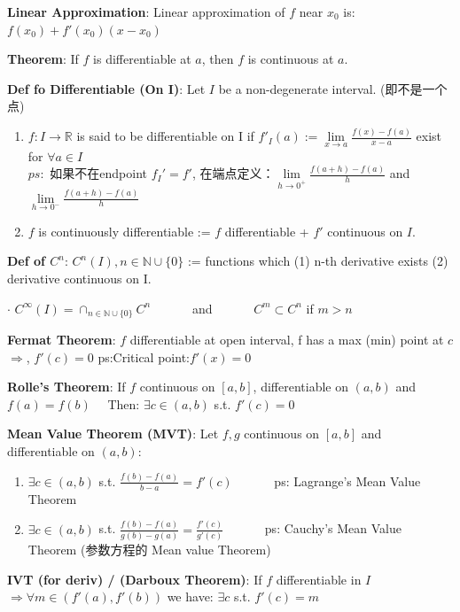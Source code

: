 \documentclass[11pt]{article}
\begin{document}
\textbf{Linear Approximation}: Linear approximation of $f$ near $x_0$ is: $f(x_0)+f'(x_0)(x-x_0)$

\textbf{Theorem}: If $f$ is differentiable at $a$, then $f$ is continuous at $a$.

\textbf{Def fo Differentiable (On I)}: Let $I$ be a non-degenerate interval. (即不是一个点)
\begin{enumerate}[itemsep=-2pt, topsep=-2pt]
    \item $f:I\to\mathbb{R}$ is said to be differentiable on I if $f'_I(a):=\lim\limits_{x\to a}\frac{f(x)-f(a)}{x-a}$ exist for $\forall a\in I$
    \\ $ps:$ 如果不在endpoint $f_I'=f'$, 在端点定义：$\lim\limits_{h\to 0^+}\frac{f(a+h)-f(a)}{h}$ and $\lim\limits_{h\to 0^-}\frac{f(a+h)-f(a)}{h}$
    \item $f$ is continuously differentiable := $f$ differentiable + $f'$ continuous on $I$.
\end{enumerate}

\textbf{Def of $C^n$}: $C^n(I),n\in \mathbb{N}\cup\{0\}$ := functions which (1) n-th derivative exists (2) derivative continuous on I.

$\cdot$ $C^\infty(I)=\cap_{n\in\mathbb{N}\cup\{0\}}C^n$ \ \ \ \ \ \ and \ \ \ \ \ \ $C^m\subset C^n$ if $m>n$

\textbf{Fermat Theorem}: $f$ differentiable at open interval, f has a max (min) point at $c$ $\Rightarrow$, $f'(c)=0$ {\footnotesize ps:Critical point:$f'(x)=0$}

\textbf{Rolle's Theorem}: If $f$ continuous on $[a,b]$, differentiable on $(a,b)$ and $f(a)=f(b)$ \ \ Then: $\exists c\in(a,b)$ s.t. $f'(c)=0$

\textbf{Mean Value Theorem (MVT)}: Let $f,g$ continuous on $[a,b]$ and differentiable on $(a,b)$: \ \ \ 
\begin{enumerate}[itemsep=-2pt, topsep=-2pt]
    \item $\exists c\in(a,b)$ s.t. $\frac{f(b)-f(a)}{b-a}=f'(c)$ \ \ \ \ \ \ ps: Lagrange's Mean Value Theorem
    \item $\exists c\in(a,b)$ s.t. $\frac{f(b)-f(a)}{g(b)-g(a)}=\frac{f'(c)}{g'(c)}$ \ \ \ \ \ \ ps: Cauchy's Mean Value Theorem (参数方程的 Mean value Theorem)
\end{enumerate}

\textbf{IVT (for deriv) / (Darboux Theorem)}: If $f$ differentiable in $I$ $\Rightarrow\forall m\in(f'(a),f'(b))$ we have: $\exists c$ s.t. $f'(c)=m$
\end{document}
